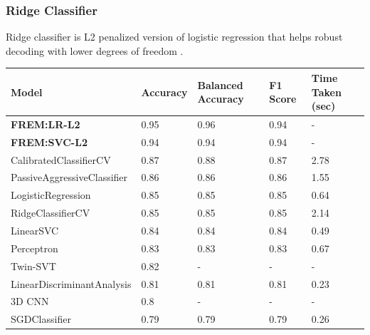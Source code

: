\documentclass[10pt, twocolumn, letterpaper]{article}
\begin{document}
\subsubsection{Ridge Classifier}
Ridge classifier is L2 penalized version of logistic regression that helps robust decoding with lower degrees of freedom \cite{scikit-learn}.


\begin{table}[]
\noindent
\centering
\begin{tabular}{l|llll}
Model                  & \multicolumn{1}{l|}{Accuracy}            & \multicolumn{1}{l|}{Balanced Accuracy}    & \multicolumn{1}{l|}{F1 Score}             & Time Taken (sec)           \\ \hline
\textbf{FREM:LR-L2} &
  \multicolumn{1}{l|}{0.95} &
  \multicolumn{1}{l|}{0.96} &
  \multicolumn{1}{l|}{0.94} &
  - \\
\textbf{FREM:SVC-L2} &
  \multicolumn{1}{l|}{0.94} &
  \multicolumn{1}{l|}{0.94} &
  \multicolumn{1}{l|}{0.94} &
  - \\
CalibratedClassifierCV &
  \multicolumn{1}{l|}{0.87} &
  \multicolumn{1}{l|}{0.88} &
  \multicolumn{1}{l|}{0.87} &
  2.78 \\
PassiveAggressiveClassifier &
  \multicolumn{1}{l|}{0.86} &
  \multicolumn{1}{l|}{0.86} &
  \multicolumn{1}{l|}{0.86} &
  1.55 \\
LogisticRegression &
  \multicolumn{1}{l|}{0.85} &
  \multicolumn{1}{l|}{0.85} &
  \multicolumn{1}{l|}{0.85} &
  0.64 \\
RidgeClassifierCV &
  \multicolumn{1}{l|}{0.85} &
  \multicolumn{1}{l|}{0.85} &
  \multicolumn{1}{l|}{0.85} &
  2.14 \\
LinearSVC &
  \multicolumn{1}{l|}{0.84} &
  \multicolumn{1}{l|}{0.84} &
  \multicolumn{1}{l|}{0.84} &
  0.49 \\
Perceptron &
  \multicolumn{1}{l|}{0.83} &
  \multicolumn{1}{l|}{0.83} &
  \multicolumn{1}{l|}{0.83} &
  0.67 \\
Twin-SVT &
  \multicolumn{1}{l|}{0.82} &
  \multicolumn{1}{l|}{-} &
  \multicolumn{1}{l|}{-} &
  - \\
LinearDiscriminantAnalysis &
  \multicolumn{1}{l|}{0.81} &
  \multicolumn{1}{l|}{0.81} &
  \multicolumn{1}{l|}{0.81} &
  0.23 \\
3D CNN &
  \multicolumn{1}{l|}{0.8} &
  \multicolumn{1}{l|}{-} &
  \multicolumn{1}{l|}{-} &
  - \\
SGDClassifier &
  \multicolumn{1}{l|}{0.79} &
  \multicolumn{1}{l|}{0.79} &
  \multicolumn{1}{l|}{0.79} &
  0.26 \\

\end{tabular}
\end{table}
\end{document}
